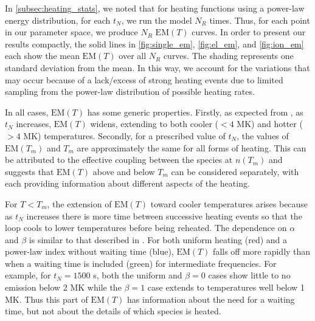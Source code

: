 \documentclass[preprint]{aastex}
\begin{document}
	\par In \autoref{subsec:heating_stats}, we noted that for heating functions using a power-law energy distribution, for each $t_N$, we run the model $N_R$ times. Thus, for each point in our parameter space, we produce $N_R$ $\mathrm{EM}(T)$ curves. In order to present our results compactly, the solid lines in \autoref{fig:single_em}, \autoref{fig:el_em}, and \autoref{fig:ion_em} each show the mean $\mathrm{EM}(T)$ over all $N_R$ curves. The shading represents one standard deviation from the mean. In this way, we account for the variations that may occur because of a lack/excess of strong heating events due to limited sampling from the power-law distribution of possible heating rates.
	\par In all cases, $\mathrm{EM}(T)$ has some generic properties. Firstly, as expected from \citet{cargill_active_2014}, as $t_N$ increases, $\mathrm{EM}(T)$ widens, extending to both cooler ($<4$ MK) and hotter ($>4$ MK) temperatures. Secondly, for a prescribed value of $t_N$, the values of $\mathrm{EM}(T_m)$ and $T_m$ are approximately the same for all forms of heating. This can be attributed to the effective coupling between the species at $n(T_m)$ and suggests that $\mathrm{EM}(T)$ above and below $T_m$ can be considered separately, with each providing information about different aspects of the heating.
	\par For $T<T_m$, the extension of $\mathrm{EM}(T)$ toward cooler temperatures arises because as $t_N$ increases there is more time between successive heating events so that the loop cools to lower temperatures before being reheated. The dependence on $\alpha$ and $\beta$ is similar to that described in \citet{cargill_active_2014}. For both uniform heating (red) and a power-law index without waiting time (blue), $\mathrm{EM}(T)$ falls off more rapidly than when a waiting time is included (green) for intermediate frequencies. For example, for $t_N=1500$ s, both the uniform and $\beta=0$ cases show little to no emission below 2 MK while the $\beta=1$ case extends to temperatures well below 1 MK. Thus this part of $\mathrm{EM}(T)$ has information about the need for a waiting time, but not about the details of which species is heated.
\end{document}

